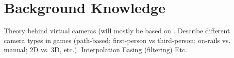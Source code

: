 \section{Background Knowledge}
Theory behind virtual cameras (will mostly be based on \cite{haigh-hutchinson_real-time_2009}.
Describe different camera types in games (path-based; first-person vs third-person; on-rails vs. manual; 2D vs. 3D, etc.).
Interpolation
Easing (filtering)
Etc.